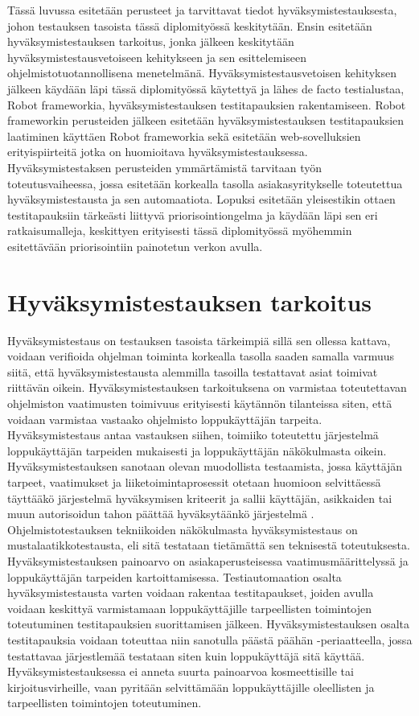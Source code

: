 Tässä luvussa esitetään perusteet ja tarvittavat tiedot hyväksymistestauksesta, johon testauksen tasoista tässä diplomityössä keskitytään.
Ensin esitetään hyväksymistestauksen tarkoitus, jonka jälkeen keskitytään hyväksymistestausvetoiseen kehitykseen ja sen esittelemiseen ohjelmistotuotannollisena menetelmänä.
Hyväksymistestausvetoisen kehityksen jälkeen käydään läpi tässä diplomityössä käytettyä ja lähes de facto testialustaa, Robot frameworkia, hyväksymistestauksen testitapauksien rakentamiseen.
Robot frameworkin perusteiden jälkeen esitetään hyväksymistestauksen testitapauksien laatiminen käyttäen Robot frameworkia sekä esitetään web-sovelluksien erityispiirteitä jotka on huomioitava hyväksymistestauksessa.
Hyväksymistestaksen perusteiden ymmärtämistä tarvitaan työn toteutusvaiheessa, jossa esitetään korkealla tasolla asiakasyritykselle toteutettua hyväksymistestausta ja sen automaatiota.
Lopuksi esitetään yleisestikin ottaen testitapauksiin tärkeästi liittyvä priorisointiongelma ja käydään läpi sen eri ratkaisumalleja, keskittyen erityisesti tässä diplomityössä myöhemmin esitettävään priorisointiin painotetun verkon avulla.

\section{Hyväksymistestauksen tarkoitus} \label{ch:08_hyvaksymistestauksen_tarkoitus}

  Hyväksymistestaus on testauksen tasoista tärkeimpiä sillä sen ollessa kattava, voidaan verifioida ohjelman toiminta korkealla tasolla saaden samalla varmuus siitä, että hyväksymistestausta alemmilla tasoilla testattavat asiat toimivat riittävän oikein.
  Hyväksymistestauksen tarkoituksena on varmistaa toteutettavan ohjelmiston vaatimusten toimivuus erityisesti käytännön tilanteissa siten, että voidaan varmistaa vastaako ohjelmisto loppukäyttäjän tarpeita.
  Hyväksymistestaus antaa vastauksen siihen, toimiiko toteutettu järjestelmä loppukäyttäjän tarpeiden mukaisesti ja loppukäyttäjän näkökulmasta oikein.
  Hyväksymistestauksen sanotaan olevan muodollista testaamista, jossa käyttäjän tarpeet, vaatimukset ja liiketoimintaprosessit otetaan huomioon selvittäessä täyttääkö järjestelmä hyväksymisen kriteerit ja sallii käyttäjän, asikkaiden tai muun autorisoidun tahon päättää hyväksytäänkö järjestelmä \parencite{istqb_glossary_nodate}.
  Ohjelmistotestauksen tekniikoiden näkökulmasta hyväksymistestaus on mustalaatikkotestausta, eli sitä testataan tietämättä sen teknisestä toteutuksesta.
  Hyväksymistestauksen painoarvo on asiakaperusteisessa vaatimusmäärittelyssä ja loppukäyttäjän tarpeiden kartoittamisessa.
  Testiautomaation osalta hyväksymistestausta varten voidaan rakentaa testitapaukset, joiden avulla voidaan keskittyä varmistamaan loppukäyttäjille tarpeellisten toimintojen toteutuminen testitapauksien suorittamisen jälkeen.
  Hyväksymistestauksen osalta testitapauksia voidaan toteuttaa niin sanotulla päästä päähän -periaatteella, jossa testattavaa järjestlemää testataan siten kuin loppukäyttäjä sitä käyttää.
  Hyväksymistestauksessa ei anneta suurta painoarvoa kosmeettisille tai kirjoitusvirheille, vaan pyritään selvittämään loppukäyttäjille oleellisten ja tarpeellisten toimintojen toteutuminen.

